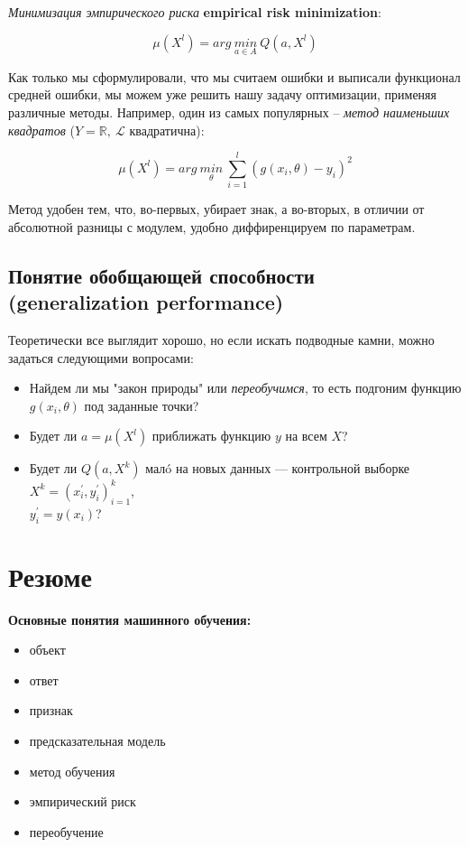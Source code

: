 \documentclass{article}
\begin{document}
\textit{Минимизация эмпирического риска} \textbf{empirical risk minimization}:

$$\mu(X^l) = arg\ \underset{a \in A}{min}\ Q(a, X^l)$$

Как только мы сформулировали, что мы считаем ошибки и выписали функционал средней ошибки, мы можем уже решить нашу задачу оптимизации, применяя различные методы. Например, один из самых популярных -- \textit{метод наименьших квадратов} ($Y = \mathbb{R},\ \mathscr{L}$ квадратична):

$$\mu(X^l) = arg\ \underset{\theta}{min}\ \sum\limits_{i = 1}^l (g(x_i, \theta) - y_i)^2$$

Метод удобен тем, что, во-первых, убирает знак, а во-вторых, в отличии от абсолютной разницы с модулем, удобно диффиренцируем по параметрам. 

\subsection{Понятие обобщающей способности (generalization performance)}

Теоретически все выглядит хорошо, но если искать подводные камни, можно задаться следующими вопросами:

\begin{itemize}
\item Найдем ли мы "закон природы" или \textit{переобучимся}, то есть подгоним функцию $g(x_i, \theta)$ под заданные точки?

\item Будет ли $a = \mu(X^l)$ приближать функцию $y$ на всем $X$?

\item Будет ли $Q(a, X^k)$ мал\'o на новых данных ---
контрольной выборке $X^k = (x_i^{'}, y_i^{'})_{i = 1}^k$,\\$y_i^{'} = y(x_i)$?

\end{itemize}

\section{Резюме}

\textbf{Основные понятия машинного обучения:}
\begin{itemize}
\item объект
\item ответ
\item признак
\item предсказательная модель
\item метод обучения
\item эмпирический риск
\item переобучение
\end{itemize}
\end{document}
